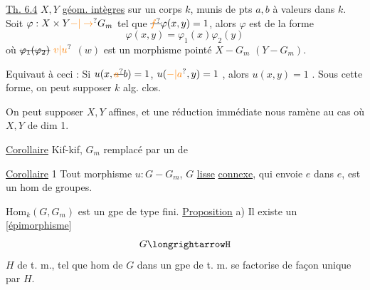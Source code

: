 \uline{Th. 6.4} $X,Y$ \uline{géom. intègres} sur un corps $k$, munis de pts $a,b$ à valeurs dans $k$. Soit $\varphi:X\times Y\unsure{\mathord{-}|\to}G_m$ tel que $\deleted{\unsure{f}}\varphi(x,y)=1$, alors $\varphi$ est de la forme
\[
\varphi(x,y)=\varphi_1(x)\varphi_2(y)
\]
où $\deleted{\varphi_1(\varphi_2)}$ $\unsure{v|u}$ $(w)$ est un morphisme pointé $X\mathrel{-}G_m$ $(Y\mathrel{-}G_m)$.
\margin{\unsure{!}}

Equivaut à ceci :  Si $u(x,\deleted{\unsure{a}}b)=1$, $u(\unsure{-|a},y)=1$ , alors $u(x,y)=1$ . Sous cette forme, on peut supposer  $k$ alg. clos.


On peut supposer $X,Y$ affines, et une réduction immédiate nous ramène au cas où $X,Y$ de dim 1.

\uline{Corollaire} Kif-kif, $G_m$ remplacé par un   de 


\uline{Corollaire} 1  Tout morphisme  $u:G\mathrel{-}G_m$,  $G$  \uline{lisse} \uline{connexe}, qui envoie $e$ dans $e$, est un hom de groupes. 

    $\mathrm{Hom}_k(G,G_m)$  est un gpe de type fini.
\uline{Proposition} a)  Il existe un  [\uline{épimorphisme}]
\[
G\longrightarrowH
\]
$H$ de t. m., tel que  hom de $G$ dans un gpe de t. m. se factorise de façon unique par $H$.


